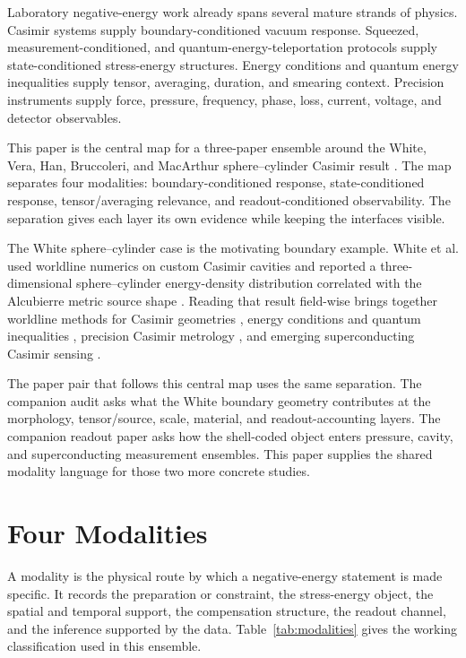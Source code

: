\documentclass[11pt]{article}
\newcommand{\Tab}{Table}
\begin{document}
Laboratory negative-energy work already spans several mature strands of
physics. Casimir systems supply boundary-conditioned vacuum response. Squeezed,
measurement-conditioned, and quantum-energy-teleportation protocols supply
state-conditioned stress-energy structures. Energy conditions and quantum
energy inequalities supply tensor, averaging, duration, and smearing context.
Precision instruments supply force, pressure, frequency, phase, loss, current,
voltage, and detector observables.

This paper is the central map for a three-paper ensemble around the White,
Vera, Han, Bruccoleri, and MacArthur sphere--cylinder Casimir result
\cite{White2021}. The map separates four modalities: boundary-conditioned
response, state-conditioned response, tensor/averaging relevance, and
readout-conditioned observability. The separation gives each layer its own
evidence while keeping the interfaces visible.

The White sphere--cylinder case is the motivating boundary example. White et
al. used worldline numerics on custom Casimir cavities and reported a
three-dimensional sphere--cylinder energy-density distribution correlated with
the Alcubierre metric source shape \cite{White2021}. Reading that result
field-wise brings together worldline methods for Casimir geometries
\cite{Schafer2015}, energy conditions and quantum inequalities
\cite{Ford2009,KontouSanders2020}, precision Casimir metrology
\cite{Bimonte2021,Stange2019}, and emerging superconducting Casimir sensing
\cite{Xu2026}.

The paper pair that follows this central map uses the same separation. The
companion audit asks what the White boundary geometry contributes at the
morphology, tensor/source, scale, material, and readout-accounting layers. The
companion readout paper asks how the shell-coded object enters pressure,
cavity, and superconducting measurement ensembles. This paper supplies the
shared modality language for those two more concrete studies.

\section{Four Modalities}

A modality is the physical route by which a negative-energy statement is made
specific. It records the preparation or constraint, the stress-energy object,
the spatial and temporal support, the compensation structure, the readout
channel, and the inference supported by the data. \Tab~\ref{tab:modalities}
gives the working classification used in this ensemble.
\end{document}
